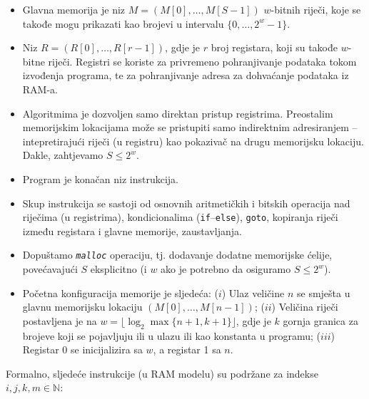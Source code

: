 \begin{itemize}
	\item Glavna memorija je niz $M = (M[0], \ldots, M[S-1])$  $w$-bitnih riječi, koje se takođe mogu prikazati kao brojevi u intervalu
 $\{0,\ldots , 2^w - 1\}$.
 	\item Niz $R = (R[0], \ldots , R[r - 1])$,  gdje je $r$ broj registara, koji su takođe $w$-bitne riječi. Registri se koriste za privremeno pohranjivanje podataka tokom izvođenja programa, te za pohranjivanje adresa za dohvaćanje podataka iz RAM-a. %
 	
 	\item Algoritmima je dozvoljen samo direktan pristup registrima. Preostalim memorijskim lokacijama može se pristupiti samo
 	indirektnim adresiranjem -- intepretirajući riječi (u registru) kao pokazivač na drugu memorijsku lokaciju. Dakle, zahtjevamo
 	$S \leq  2^w$.
 	\item Program je konačan niz instrukcija.
 	\item Skup instrukcija se sastoji od osnovnih aritmetičkih i bitskih operacija nad riječima (u registrima), kondicionalima
 	(\texttt{if}--\texttt{else}), \texttt{goto}, kopiranja riječi između registara i glavne memorije, zaustavljanja.
 	\item Dopuštamo \texttt{\textit{malloc}} operaciju, tj. dodavanje dodatne memorijske ćelije, povećavajući $S$ eksplicitno (i $w$ ako je potrebno da osiguramo $S \leq 2^w$).
 	\item Početna konfiguracija memorije je sljedeća:
 	($i$) Ulaz veličine $n$ se smješta  u glavnu memorijsku lokaciju $(M[0],\ldots , M[n - 1])$; ($ii$) Veličina riječi postavljena je na $w = \lfloor \log_2 \max\{n + 1, k + 1\} \rfloor $, gdje je $k$ gornja granica za brojeve koji se
 	pojavljuju ili u ulazu ili kao konstanta u programu; ($iii$) Registar 0 se inicijalizira sa $w$, a registar 1 sa $n$.
 \end{itemize}

Formalno, sljedeće instrukcije (u RAM modelu) su podržane za indekse $i, j, k, m \in \mathbb{N} $:

%

